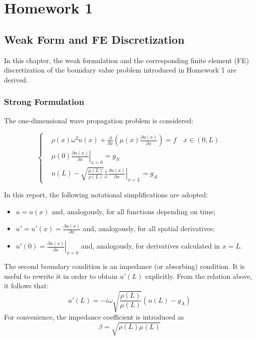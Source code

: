 
\chapter{Homework 1}

\section{Weak Form and FE Discretization}
\label{sc:11}

In this chapter, the weak formulation and the corresponding finite element (FE) discretization of the boundary value problem introduced in Homework 1 are derived.

\subsection{Strong Formulation}

The one-dimensional wave propagation problem is considered:

\begin{equation}
\left\{
\begin{aligned}
&\rho(x) \omega^{2} u(x) + \frac{\partial}{\partial x} \left(\mu(x) \frac{\partial u(x)}{\partial x}\right) = f \quad x \in (0,L)\\
&\mu(0) \left.\frac{\partial u(x)}{\partial x}\right|_{x = 0} = g_N \\
&u(L) - \sqrt{\frac{\mu(L)}{\rho(L)}} \frac{i}{\omega} \left.\frac{\partial u(x)}{\partial x}\right|_{x = L} = g_A
\end{aligned}
\right.
\label{eq:strongform}
\end{equation}

In this report, the following notational simplifications are adopted:

\begin{itemize}
    \item \( u = u(x) \) and, analogously, for all functions depending on time;
    \item \( u' = u'(x) = \frac{\partial u(x)}{\partial x} \) and, analogously, for all spatial derivatives;
    \item \( u'(0) = \left.\frac{\partial u(x)}{\partial x}\right|_{x = 0} \) and, analogously, for derivatives calculated in \( x = L\).
\end{itemize}

The second boundary condition is an impedance (or absorbing) condition. It is useful to rewrite it in order to obtain \( u'(L) \) explicitly. From the relation above, it follows that:
\[
u'(L) = -i \omega \sqrt{\frac{\rho(L)}{\mu(L)}} \left( u(L) - g_A \right)
\]
For convenience, the impedance coefficient is introduced as
\[
\beta = \sqrt{\rho(L)\mu(L)}
\]

